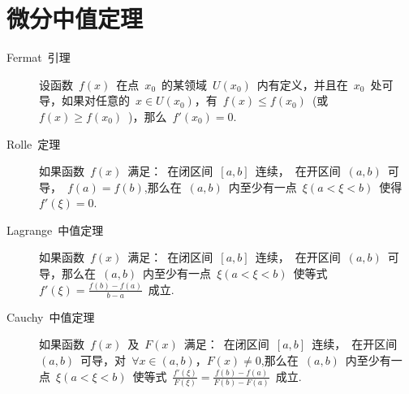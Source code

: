 \section{微分中值定理}
  \begin{description}
    \item[Fermat~引理] 设函数~$f(x)$~在点~$x_0$~的某领域~$U(x_0)$~内有定义，并且在~$x_0$~处可导，如果对任意的~$x \in U(x_0)$，有~$f(x) \le f(x_0)$~(或~$f(x) \ge f(x_0)$~)，那么~$f'(x_0)=0$.
    \item[Rolle~定理] 如果函数~$f(x)$~满足：~在闭区间~$[a, b]$~连续，~在开区间~$(a, b)$~可导，~$f(a)=f(b)$,那么在~$(a, b)$~内至少有一点~$\xi(a<\xi<b)$~使得~$f'(\xi)=0$.
    \item[Lagrange~中值定理] 如果函数~$f(x)$~满足：~在闭区间~$[a, b]$~连续，~在开区间~$(a, b)$~可导，那么在~$(a, b)$~内至少有一点~$\xi(a<\xi<b)$~使等式~$f'(\xi)=\frac{f(b)-f(a)}{b-a}$~成立.
    \item[Cauchy~中值定理] 如果函数~$f(x)$~及~$F(x)$~满足：~在闭区间~$[a, b]$~连续，~在开区间~$(a, b)$~可导，对~$\forall x \in (a, b)$，$F(x)\ne0$,那么在~$(a, b)$~内至少有一点~$\xi(a<\xi<b)$~使等式~$\frac{f'(\xi)}{F(\xi)}=\frac{f(b)-f(a)}{F(b)-F(a)}$~成立.
  \end{description}

